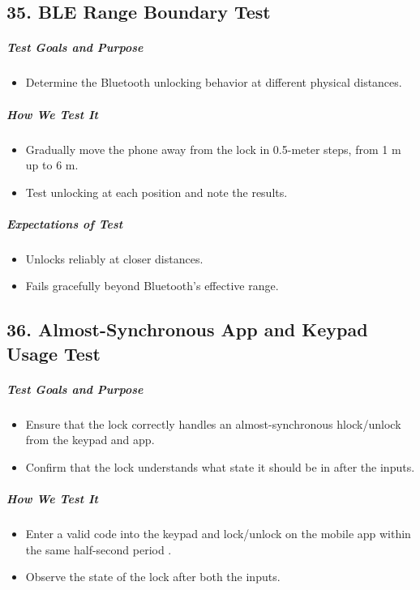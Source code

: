\subsection*{35. BLE Range Boundary Test}
\subparagraph{Test Goals and Purpose}
\begin{itemize}
    \item Determine the Bluetooth unlocking behavior at different physical distances.
\end{itemize}
\subparagraph{How We Test It}
\begin{itemize}
    \item Gradually move the phone away from the lock in 0.5-meter steps, from 1 m up to 6 m.
    \item Test unlocking at each position and note the results.
\end{itemize}
\subparagraph{Expectations of Test}
\begin{itemize}
    \item Unlocks reliably at closer distances.
    \item Fails gracefully beyond Bluetooth’s effective range.
\end{itemize}

\subsection*{36. Almost-Synchronous App and Keypad Usage Test}
\subparagraph{Test Goals and Purpose}
\begin{itemize}
    \item Ensure that the lock correctly handles an almost-synchronous hlock/unlock from the keypad and app.
    \item Confirm that the lock understands what state it should be in after the inputs.
\end{itemize}

\subparagraph{How We Test It}
\begin{itemize}
    \item Enter a valid code into the keypad and lock/unlock on the mobile app within the same half-second period .
    \item Observe the state of the lock after both the inputs.
\end{itemize}

